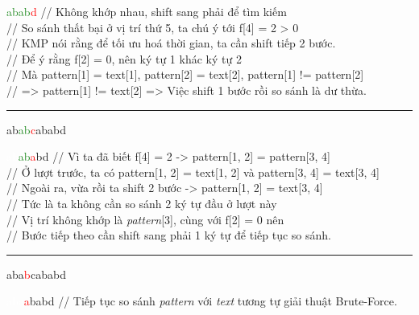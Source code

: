 \documentclass[a4paper,11pt]{article}
\begin{document}
			\textcolor{ForestGreen}{abab}\textcolor{red}{d}			\hspace*{1.2cm} // Không khớp nhau, shift sang phải để tìm kiếm \\
																	\hspace*{2.9cm} // So sánh thất bại ở vị trí thứ 5, ta chú ý tới f[4] = 2 > 0 \\
																	\hspace*{2.9cm} // KMP nói rằng để tối ưu hoá thời gian, ta cần shift tiếp 2 bước.\\
																	\hspace*{2.9cm} // Để ý rằng f[2] = 0, nên ký tự 1 khác ký tự 2 \\  
																	\hspace*{2.9cm} // Mà pattern[1] = text[1], pattern[2] = text[2], pattern[1] != pattern[2] \\ 
																	\hspace*{2.9cm} // => pattern[1] != text[2] => Việc shift 1 bước rồi so sánh là dư thừa.

			\vspace*{2mm}
			\hrule
			ab\textcolor{ForestGreen}{ab}\textcolor{red}{c}ababd
			
			\textcolor{white}{ab}\textcolor{ForestGreen}{ab}\textcolor{red}{a}bd 			\hspace*{0.8cm} // Vì ta đã biết f[4] = 2 -> pattern[1, 2] = pattern[3, 4] \\
																							\hspace*{2.9cm} // Ở lượt trước, ta có pattern[1, 2] = text[1, 2] và pattern[3, 4] = text[3, 4] \\
																							\hspace*{2.9cm} // Ngoài ra, vừa rồi ta shift 2 bước -> pattern[1, 2] = text[3, 4]\\
																							\hspace*{2.9cm} // Tức là ta không cần so sánh 2 ký tự đầu ở lượt này\\
																							\hspace*{2.9cm} // Vị trí không khớp là \textit{pattern}[3], cùng với f[2] = 0 nên \\
																							\hspace*{2.9cm} // Bước tiếp theo cần shift sang phải 1 ký tự để tiếp tục so sánh.

			\vspace*{2mm}
			\hrule
			aba\textcolor{red}{b}cababd
			
			\textcolor{white}{aba}\textcolor{red}{a}babd 						\hspace*{1.2cm} // Tiếp tục so sánh \textit{pattern} với \textit{text} tương tự giải thuật Brute-Force. 
\end{document}
